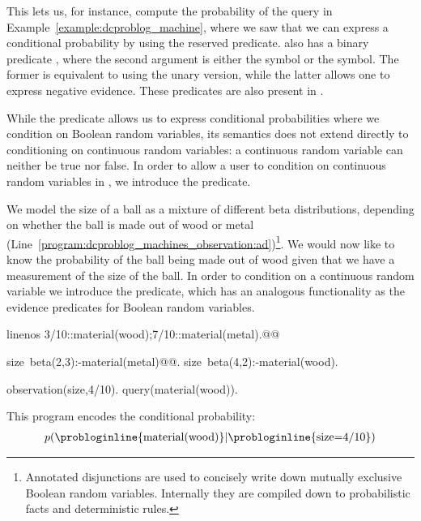 This lets us, for instance, compute the probability of the query in Example~\ref{example:dcproblog_machine}, where we saw that we can express a conditional probability by using the reserved  predicate. \dcproblogsty also has a binary predicate , where the second argument is either the  symbol or the  symbol. The former is equivalent to using the unary version, while the latter allows one to express negative evidence. These predicates are also present in \problogsty.



While the  predicate allows us to express conditional probabilities where we condition on Boolean random variables, its semantics does not extend directly to conditioning on continuous random variables: a continuous random variable can neither be true nor false. In order to allow a user to condition on continuous random variables in \dcproblogsty, we introduce the  predicate.

\begin{example}\label{example:dcproblog:observation}
	We model the size of a ball as a mixture of  different beta distributions, depending on whether the ball is made out of wood or metal (Line~\ref{program:dcproblog_machines_observation:ad})\footnote{Annotated disjunctions are used to concisely write down mutually exclusive Boolean random variables. Internally they are compiled down to probabilistic facts and deterministic rules.}.
	We would now like to know the probability of the ball being made out of wood given that we have a measurement of the size of the ball. In order to condition on a continuous random variable we introduce the  predicate, which has an analogous functionality as the evidence predicates for Boolean random variables.
	\begin{problog*}{linenos}
3/10::material(wood);7/10::material(metal).@\label{program:dcproblog_machines_observation:ad}@

size~beta(2,3):-material(metal)@\label{example:dcproblog:observation:beta23}@.
size~beta(4,2):-material(wood).

observation(size,4/10).
query(material(wood)).
	\end{problog*}
	This \dcproblogsty program encodes the conditional probability:
	\begin{align}
		p(\text{\probloginline{material(wood)}}| \text{\probloginline{size=4/10}})
	\end{align}
\end{example}



